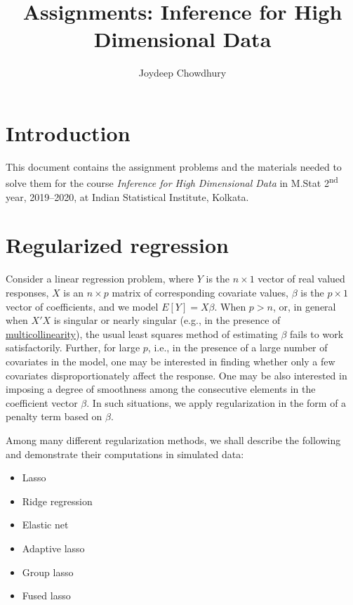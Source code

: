 \documentclass[
]{book}
\title{Assignments: Inference for High Dimensional Data}
\author{Joydeep Chowdhury}
\date{}
\providecommand{\tightlist}{%
  \setlength{\itemsep}{0pt}\setlength{\parskip}{0pt}}
\begin{document}
\maketitle

{
\setcounter{tocdepth}{1}
\tableofcontents
}
\hypertarget{introduction}{%
\chapter*{Introduction}\label{introduction}}

This document contains the assignment problems and the materials needed to solve them for the course \emph{Inference for High Dimensional Data} in M.Stat 2\textsuperscript{nd} year, 2019--2020, at Indian Statistical Institute, Kolkata.

\hypertarget{regularizations}{%
\chapter{Regularized regression}\label{regularizations}}

Consider a linear regression problem, where \(Y\) is the \(n \times 1\) vector of real valued responses, \(X\) is an \(n \times p\) matrix of corresponding covariate values, \(\beta\) is the \(p \times 1\) vector of coefficients, and we model \(E[Y] = X \beta\).
When \(p > n\), or, in general when \(X'X\) is singular or nearly singular (e.g., in the presence of \href{https://en.wikipedia.org/wiki/Multicollinearity}{multicollinearity}), the usual least squares method of estimating \(\beta\) fails to work satisfactorily. Further, for large \(p\), i.e., in the presence of a large number of covariates in the model, one may be interested in finding whether only a few covariates disproportionately affect the response. One may be also interested in imposing a degree of smoothness among the consecutive elements in the coefficient vector \(\beta\). In such situations, we apply regularization in the form of a penalty term based on \(\beta\).

Among many different regularization methods, we shall describe the following and demonstrate their computations in simulated data:

\begin{itemize}
\tightlist
\item
  Lasso
\item
  Ridge regression
\item
  Elastic net
\item
  Adaptive lasso
\item
  Group lasso
\item
  Fused lasso
\end{itemize}
\end{document}
